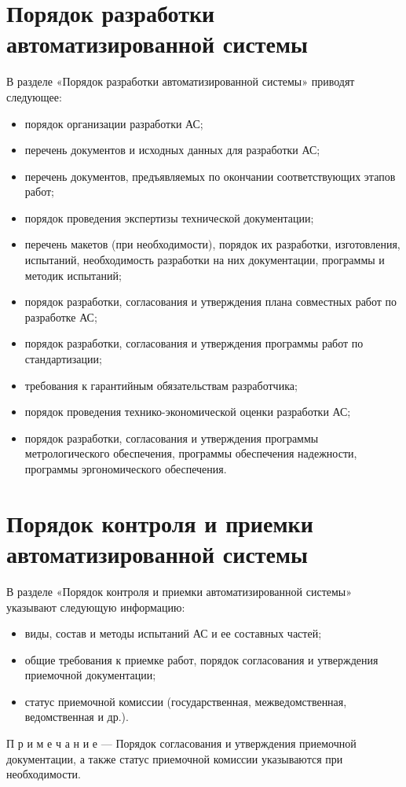 {\section{Порядок разработки автоматизированной системы}
В разделе «Порядок разработки автоматизированной системы» приводят следующее:
\begin{itemize}
  \item порядок организации разработки АС;
  \item перечень документов и исходных данных для разработки АС;
  \item перечень документов, предъявляемых по окончании соответствующих этапов работ;
  \item порядок проведения экспертизы технической документации;
  \item перечень макетов (при необходимости), порядок их разработки, изготовления, испытаний, необходимость разработки на них документации, программы и методик испытаний;
  \item порядок разработки, согласования и утверждения плана совместных работ по разработке АС;
  \item порядок разработки, согласования и утверждения программы работ по стандартизации;
  \item требования к гарантийным обязательствам разработчика;
  \item порядок проведения технико-экономической оценки разработки АС;
  \item порядок разработки, согласования и утверждения программы метрологического обеспечения, программы обеспечения надежности, программы эргономического обеспечения.
\end{itemize}

\section{Порядок контроля и приемки автоматизированной системы}
В разделе «Порядок контроля и приемки автоматизированной системы» указывают следующую информацию:
\begin{itemize}
  \item виды, состав и методы испытаний АС и ее составных частей;
  \item общие требования к приемке работ, порядок согласования и утверждения приемочной документации;
  \item статус приемочной комиссии (государственная, межведомственная, ведомственная и др.).
\end{itemize}
П р и м е ч а н и е — Порядок согласования и утверждения приемочной документации, а также статус приемочной комиссии указываются при необходимости.

}
